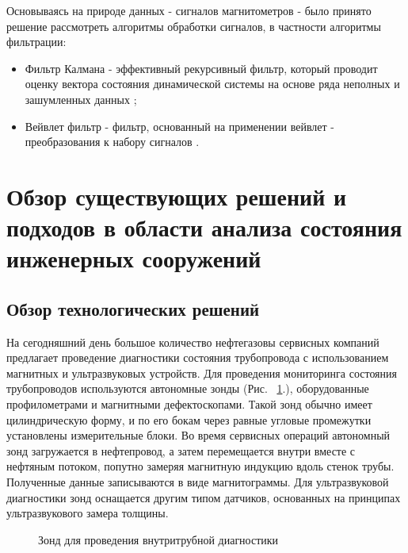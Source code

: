 \documentclass[a4paper,article,14pt]{extarticle}
\begin{document}
Основываясь на природе данных - сигналов магнитометров - было принято решение рассмотреть алгоритмы  обработки сигналов, в частности алгоритмы фильтрации:

\begin{itemize}
    \item Фильтр Калмана - эффективный рекурсивный фильтр, который проводит оценку вектора состояния динамической системы 
    на основе ряда неполных и зашумленных данных \cite{a11};
    \item Вейвлет фильтр - фильтр, основанный на применении вейвлет - преобразования к набору сигналов \cite{a12}.
\end{itemize}

\pagebreak

\section{Обзор существующих решений и подходов в области анализа состояния инженерных сооружений}

\subsection{Обзор технологических решений}

На сегодняшний день большое количество нефтегазовы сервисных компаний предлагает проведение диагностики состояния 
трубопровода с использованием магнитных и ультразвуковых устройств. Для проведения мониторинга состояния трубопроводов 
используются автономные зонды (Рис. ~\ref{image1}.), оборудованные профилометрами и магнитными дефектоскопами. Такой зонд обычно имеет 
цилиндрическую форму, и по его бокам через равные угловые промежутки установлены измерительные блоки. Во время сервисных 
операций автономный зонд загружается в нефтепровод, а затем перемещается внутри вместе с нефтяным потоком, попутно замеряя 
магнитную индукцию вдоль стенок трубы. Полученные данные записываются в виде магнитограммы. Для ультразвуковой диагностики зонд 
оснащается другим типом датчиков, основанных на принципах ультразвукового замера толщины.

\begin{figure}[ht]
    \begin{center}
    
    \caption{
    \label{image1}
    Зонд для проведения внутритрубной диагностики}
    \end {center}
\end {figure}
\end{document}
